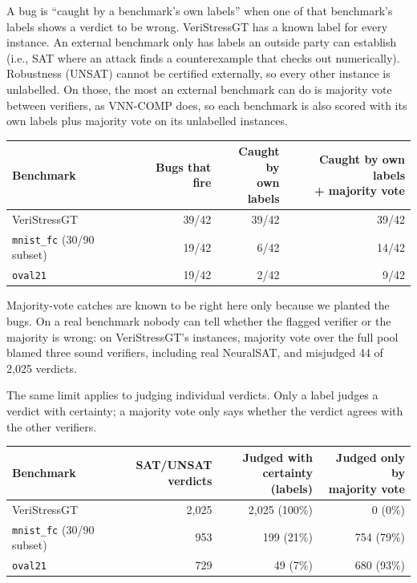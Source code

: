 \documentclass[11pt]{article}
\newcommand{\code}[1]{\texttt{#1}}
\begin{document}
A bug is ``caught by a benchmark's own labels'' when one of that benchmark's labels shows a
verdict to be wrong. VeriStressGT has a known label for every instance. An external benchmark only
has labels an outside party can establish (i.e., SAT where an attack finds a counterexample that
checks out numerically). Robustness (UNSAT) cannot be certified externally, so every other
instance is unlabelled. On those, the most an external benchmark can do is majority vote between
verifiers, as VNN-COMP does, so each benchmark is also scored with its own labels plus majority vote
on its unlabelled instances.

\begin{center}\small
\begin{tabular}{@{}lrrr@{}}
\toprule
Benchmark & Bugs that fire & \shortstack[r]{Caught by\\own labels} & \shortstack[r]{Caught by own labels\\+ majority vote} \\
\midrule
VeriStressGT & 39/42 & 39/42 & 39/42 \\
\code{mnist\_fc} (30/90 subset) & 19/42 & 6/42 & 14/42 \\
\code{oval21} & 19/42 & 2/42 & 9/42 \\
\bottomrule
\end{tabular}
\end{center}

Majority-vote catches are known to be right here only because we planted the bugs. On a real
benchmark nobody can tell whether the flagged verifier or the majority is wrong: on VeriStressGT's
instances, majority vote over the full pool blamed three sound verifiers, including real NeuralSAT,
and misjudged 44 of 2{,}025 verdicts.

The same limit applies to judging individual verdicts. Only a label judges a verdict with
certainty; a majority vote only says whether the verdict agrees with the other verifiers.

\begin{center}\small
\begin{tabular}{@{}lrrr@{}}
\toprule
Benchmark & \shortstack[r]{SAT/UNSAT\\verdicts} & \shortstack[r]{Judged with\\certainty (labels)} & \shortstack[r]{Judged only by\\majority vote} \\
\midrule
VeriStressGT & 2{,}025 & 2{,}025 (100\%) & 0 (0\%) \\
\code{mnist\_fc} (30/90 subset) & 953 & 199 (21\%) & 754 (79\%) \\
\code{oval21} & 729 & 49 (7\%) & 680 (93\%) \\
\bottomrule
\end{tabular}
\end{center}
\end{document}
